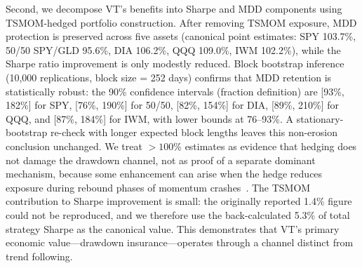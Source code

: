 Second, we decompose VT's benefits into Sharpe and MDD components using TSMOM-hedged portfolio construction. After removing TSMOM exposure, MDD protection is preserved across five assets (canonical point estimates: SPY 103.7\%, 50/50 SPY/GLD 95.6\%, DIA 106.2\%, QQQ 109.0\%, IWM 102.2\%), while the Sharpe ratio improvement is only modestly reduced. Block bootstrap inference (10,000 replications, block size = 252 days) confirms that MDD retention is statistically robust: the 90\% confidence intervals (fraction definition) are [93\%, 182\%] for SPY, [76\%, 190\%] for 50/50, [82\%, 154\%] for DIA, [89\%, 210\%] for QQQ, and [87\%, 184\%] for IWM, with lower bounds at 76--93\%. A stationary-bootstrap re-check with longer expected block lengths leaves this non-erosion conclusion unchanged. We treat $>100\%$ estimates as evidence that hedging does not damage the drawdown channel, not as proof of a separate dominant mechanism, because some enhancement can arise when the hedge reduces exposure during rebound phases of momentum crashes~\citep{daniel2016}. The TSMOM contribution to Sharpe improvement is small: the originally reported 1.4\% figure could not be reproduced, and we therefore use the back-calculated 5.3\% of total strategy Sharpe as the canonical value. This demonstrates that VT's primary economic value---drawdown insurance---operates through a channel distinct from trend following.

